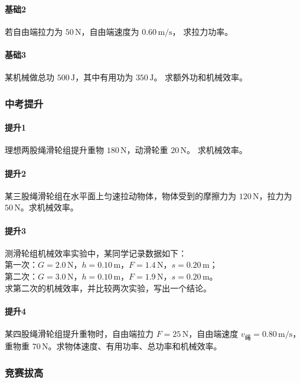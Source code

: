 \documentclass[12pt,a4paper]{ctexart}
\begin{document}
\paragraph{基础2}
若自由端拉力为 $50\,\mathrm{N}$，自由端速度为 $0.60\,\mathrm{m/s}$，
求拉力功率。

\paragraph{基础3}
某机械做总功 $500\,\mathrm{J}$，其中有用功为 $350\,\mathrm{J}$。
求额外功和机械效率。

\subsubsection*{中考提升}
\paragraph{提升1}
理想两股绳滑轮组提升重物 $180\,\mathrm{N}$，动滑轮重 $20\,\mathrm{N}$。
求机械效率。

\paragraph{提升2}
某三股绳滑轮组在水平面上匀速拉动物体，物体受到的摩擦力为
$120\,\mathrm{N}$，拉力为 $50\,\mathrm{N}$。求机械效率。

\paragraph{提升3}
测滑轮组机械效率实验中，某同学记录数据如下：\\
第一次：$G=2.0\,\mathrm{N}$，$h=0.10\,\mathrm{m}$，$F=1.4\,\mathrm{N}$，$s=0.20\,\mathrm{m}$；\\
第二次：$G=3.0\,\mathrm{N}$，$h=0.10\,\mathrm{m}$，$F=1.9\,\mathrm{N}$，$s=0.20\,\mathrm{m}$。\\
求第二次的机械效率，并比较两次实验，写出一个结论。

\paragraph{提升4}
某四股绳滑轮组提升重物时，自由端拉力 $F=25\,\mathrm{N}$，自由端速度
$v_{\text{绳}}=0.80\,\mathrm{m/s}$，重物重 $70\,\mathrm{N}$。求物体速度、有用功率、总功率和机械效率。

\subsubsection*{竞赛拔高}
\end{document}
